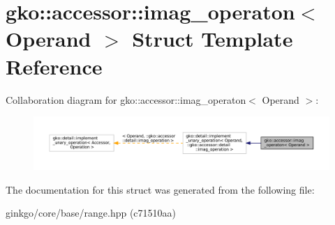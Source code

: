 \hypertarget{structgko_1_1accessor_1_1imag__operaton}{}\section{gko\+:\+:accessor\+:\+:imag\+\_\+operaton$<$ Operand $>$ Struct Template Reference}
\label{structgko_1_1accessor_1_1imag__operaton}


Collaboration diagram for gko\+:\+:accessor\+:\+:imag\+\_\+operaton$<$ Operand $>$\+:
\nopagebreak
\begin{figure}[H]
\begin{center}
\leavevmode
\includegraphics[width=350pt]{structgko_1_1accessor_1_1imag__operaton__coll__graph}
\end{center}
\end{figure}


The documentation for this struct was generated from the following file\+:\begin{DoxyCompactItemize}
\item 
ginkgo/core/base/range.\+hpp (c71510aa)\end{DoxyCompactItemize}
